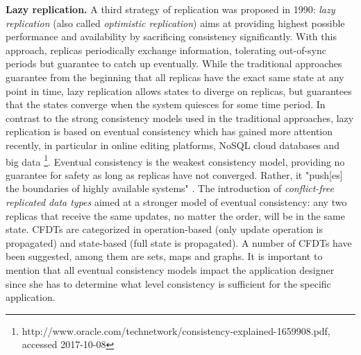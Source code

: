 \textbf{Lazy replication.} A third strategy of replication was proposed in 1990: \textit{lazy replication} \cite{Ladin:1990,Ladin:1992} (also called \textit{optimistic replication}) aims at providing highest possible performance and availability by sacrificing consistency significantly. With this approach, replicas periodically exchange information, tolerating out-of-sync periods but guarantee to catch up eventually. While the traditional approaches guarantee from the beginning that all replicas have the exact same state at any point in time, lazy replication allows states to diverge on replicas, but guarantees that the states converge when the system quiesces for some time period. In contrast to the strong consistency models used in the traditional approaches, lazy replication is based on eventual consistency which has gained more attention recently, in particular in online editing platforms, NoSQL cloud databases and big data \footnote{http://www.oracle.com/technetwork/consistency-explained-1659908.pdf, accessed 2017-10-08}. Eventual consistency is the weakest consistency model, providing no guarantee for safety as long as replicas have not converged. Rather, it "push[es] the boundaries of highly available systems" \cite{Bailis:2013}. The introduction of \textit{conflict-free replicated data types} \cite{Shapiro:2011} aimed at a stronger model of eventual consistency: any two replicas that receive the same updates, no matter the order, will be in the same state. CFDTs are categorized in operation-based (only update operation is propagated) and state-based (full state is propagated). A number of CFDTs have been suggested, among them are sets, maps and graphs. It is important to mention that all eventual consistency models impact the application designer since she has to determine what level consistency is sufficient for the specific application.



